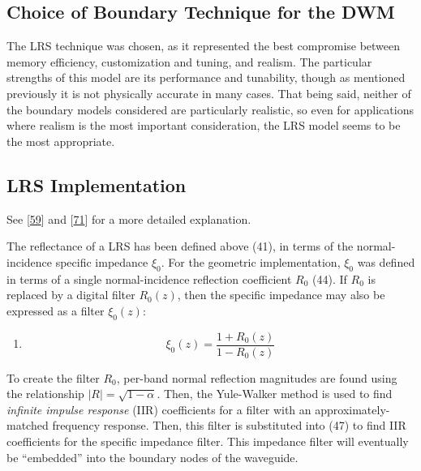 \documentclass[]{scrreprt}
\providecommand{\tightlist}{%
  \setlength{\itemsep}{0pt}\setlength{\parskip}{0pt}}
\begin{document}
\subsection{Choice of Boundary Technique for the
DWM}\label{choice-of-boundary-technique-for-the-dwm}

The LRS technique was chosen, as it represented the best compromise
between memory efficiency, customization and tuning, and realism. The
particular strengths of this model are its performance and tunability,
though as mentioned previously it is not physically accurate in many
cases. That being said, neither of the boundary models considered are
particularly realistic, so even for applications where realism is the
most important consideration, the LRS model seems to be the most
appropriate.

\subsection{LRS Implementation}\label{lrs-implementation}

See {[}\protect\hyperlink{ref-kowalczykux5fmodelingux5f2008}{59}{]} and
{[}\protect\hyperlink{ref-kowalczykux5fmodellingux5f2008}{71}{]} for a
more detailed explanation.

The reflectance of a LRS has been defined above (41), in terms of the
normal-incidence specific impedance \(\xi_0\). For the geometric
implementation, \(\xi_0\) was defined in terms of a single
normal-incidence reflection coefficient \(R_0\) (44). If \(R_0\) is
replaced by a digital filter \(R_0(z)\), then the specific impedance may
also be expressed as a filter \(\xi_0(z)\):

\begin{enumerate}
\def\labelenumi{(\arabic{enumi})}
\setcounter{enumi}{46}
\tightlist
\item
  \[\xi_0(z)=\frac{1+R_0(z)}{1-R_0(z)}\]
\end{enumerate}

To create the filter \(R_0\), per-band normal reflection magnitudes are
found using the relationship \(|R|=\sqrt{1-\alpha}\). Then, the
Yule-Walker method is used to find \emph{infinite impulse response}
(IIR) coefficients for a filter with an approximately-matched frequency
response. Then, this filter is substituted into (47) to find IIR
coefficients for the specific impedance filter. This impedance filter
will eventually be ``embedded'' into the boundary nodes of the
waveguide.
\end{document}
